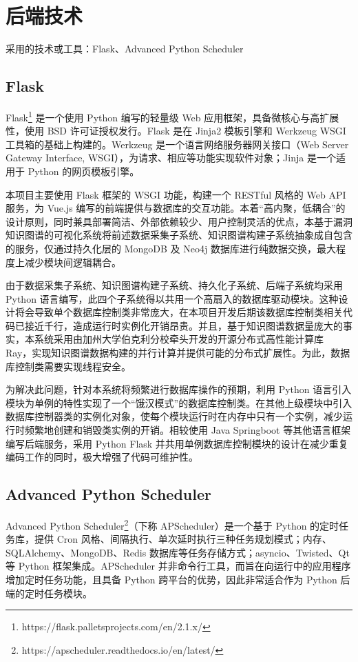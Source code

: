 \documentclass[a4paper,AutoFakeBold,oneside,12pt]{book}
\begin{document}
\section{后端技术}

采用的技术或工具：Flask、Advanced Python Scheduler

\subsection{Flask}

Flask\footnote{https://flask.palletsprojects.com/en/2.1.x/} 是一个使用 Python 编写的轻量级 Web 应用框架，具备微核心与高扩展性，使用 BSD 许可证授权发行。Flask 是在 Jinja2 模板引擎和 Werkzeug WSGI 工具箱的基础上构建的。Werkzeug 是一个语言网络服务器网关接口（Web Server Gateway Interface, WSGI），为请求、相应等功能实现软件对象；Jinja 是一个适用于 Python 的网页模板引擎。

本项目主要使用 Flask 框架的 WSGI 功能，构建一个 RESTful 风格的 Web API 服务，为 Vue.js 编写的前端提供与数据库的交互功能。本着“高内聚，低耦合”的设计原则，同时兼具部署简洁、外部依赖较少、用户控制灵活的优点，本基于漏洞知识图谱的可视化系统将前述数据采集子系统、知识图谱构建子系统抽象成自包含的服务，仅通过持久化层的 MongoDB 及 Neo4j 数据库进行纯数据交换，最大程度上减少模块间逻辑耦合。

由于数据采集子系统、知识图谱构建子系统、持久化子系统、后端子系统均采用 Python 语言编写，此四个子系统得以共用一个高扇入的数据库驱动模块。这种设计将会导致单个数据库控制类非常庞大，在本项目开发后期该数据库控制类相关代码已接近千行，造成运行时实例化开销昂贵。并且，基于知识图谱数据量庞大的事实，本系统采用由加州大学伯克利分校牵头开发的开源分布式高性能计算库 Ray，实现知识图谱数据构建的并行计算并提供可能的分布式扩展性。为此，数据库控制类需要实现线程安全。

为解决此问题，针对本系统将频繁进行数据库操作的预期，利用 Python 语言引入模块为单例的特性实现了一个“饿汉模式”的数据库控制类。在其他上级模块中引入数据库控制器类的实例化对象，使每个模块运行时在内存中只有一个实例，减少运行时频繁地创建和销毁类实例的开销。相较使用 Java Springboot 等其他语言框架编写后端服务，采用 Python Flask 并共用单例数据库控制模块的设计在减少重复编码工作的同时，极大增强了代码可维护性。

\subsection{Advanced Python Scheduler}

Advanced Python Scheduler\footnote{https://apscheduler.readthedocs.io/en/latest/}（下称 APScheduler）是一个基于 Python 的定时任务库，提供 Cron 风格、间隔执行、单次延时执行三种任务规划模式；内存、SQLAlchemy、MongoDB、Redis 数据库等任务存储方式；asyncio、Twisted、Qt 等 Python 框架集成。APScheduler 并非命令行工具，而旨在向运行中的应用程序增加定时任务功能，且具备 Python 跨平台的优势，因此非常适合作为 Python 后端的定时任务模块。
\end{document}
